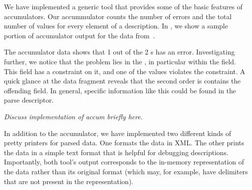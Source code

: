 We have implemented a generic tool that provides some of the basic
features of \padsc{} accumulators. Our accummulator counts the number
of errors and the total number of values for every element of a
description. In , we show a sample
portion of accumulator output for the \dibbler{} data
from~.

The accumulator data shows that 1 out of the 2 s has an
error. Investigating further, we notice that the problem lies in the
, in particular within the  field.
This field has a constraint on it, and one of the values violates the
constraint. A quick glance at the data fragment reveals that the
second order is contains the offending field. In general, specific
information like this could be found in the parse descriptor.

\emph{Discuss implementation of accum briefly here.}

In addition to the accumulator, we have implemented two different
kinds of pretty printers for parsed data.  One formats the data in
XML. The other prints the data in a simple text format that is helpful
for debugging descriptions. Importantly, both tool's output corresponds to the in-memory
representation of the data rather than its original format (which may,
for example, have delimiters that are not present in the
representation).

